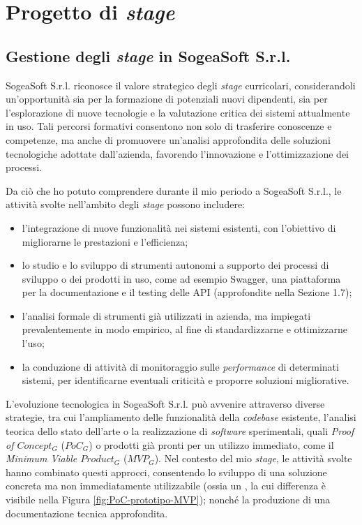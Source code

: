 \chapter{Progetto di \textit{stage}}
    \section{Gestione degli \textit{stage} in SogeaSoft S.r.l.}
    SogeaSoft S.r.l. riconosce il valore strategico degli \textit{stage} curricolari, considerandoli un'opportunità sia per la formazione di potenziali nuovi dipendenti, sia per l'esplorazione di nuove tecnologie e la valutazione critica dei sistemi attualmente in uso. Tali percorsi formativi consentono non solo di trasferire conoscenze e competenze, ma anche di promuovere un'analisi approfondita delle soluzioni tecnologiche adottate dall'azienda, favorendo l'innovazione e l'ottimizzazione dei processi.  

    \vspace{0.2 em}
    \noindent Da ciò che ho potuto comprendere durante il mio periodo a SogeaSoft S.r.l., le attività svolte nell'ambito degli \textit{stage} possono includere: 
    \begin{itemize}
        \item l'integrazione di nuove funzionalità nei sistemi esistenti, con l'obiettivo di migliorarne le prestazioni e l'efficienza;
        \item lo studio e lo sviluppo di strumenti autonomi a supporto dei processi di sviluppo o dei prodotti in uso, come ad esempio Swagger, una piattaforma per la documentazione e il testing delle API (approfondite nella Sezione 1.7);  
        \item l'analisi formale di strumenti già utilizzati in azienda, ma impiegati prevalentemente in modo empirico, al fine di standardizzarne e ottimizzarne l’uso;  
        \item la conduzione di attività di monitoraggio sulle \textit{performance} di determinati sistemi, per identificarne eventuali criticità e proporre soluzioni migliorative.  
    \end{itemize}

    \vspace{0.2 em}
    \noindent L'evoluzione tecnologica in SogeaSoft S.r.l. può avvenire attraverso diverse strategie, tra cui l’ampliamento delle funzionalità della \textit{codebase} esistente, l’analisi teorica dello stato dell’arte o la realizzazione di \textit{software} sperimentali, quali \textit{Proof of $Concept_G$} ($PoC_G$) o prodotti già pronti per un utilizzo immediato, come il \textit{Minimum Viable $Product_G$} ($MVP_G$). Nel contesto del mio \textit{stage}, le attività svolte hanno combinato questi approcci, consentendo lo sviluppo di una soluzione concreta ma non immediatamente utilizzabile (ossia un , la cui differenza è visibile nella Figura \ref{fig:PoC-prototipo-MVP}); nonché la produzione di una documentazione tecnica approfondita.  
    
